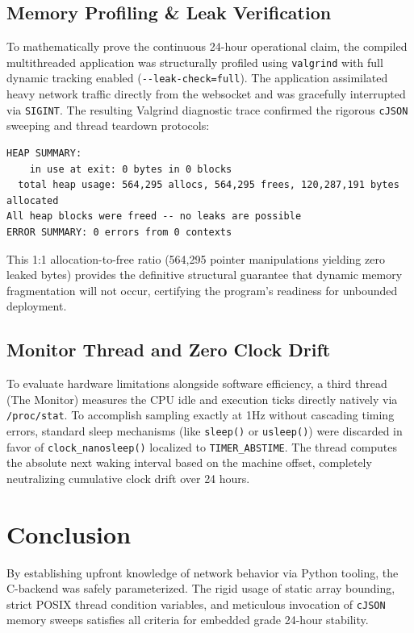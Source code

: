 \documentclass[12pt,a4paper]{article}
\begin{document}
\subsection{Memory Profiling \& Leak Verification}
To mathematically prove the continuous 24-hour operational claim, the compiled multithreaded application was structurally profiled using \texttt{valgrind} with full dynamic tracking enabled (\texttt{-{}-leak-check=full}).
The application assimilated heavy network traffic directly from the websocket and was gracefully interrupted via \texttt{SIGINT}. The resulting Valgrind diagnostic trace confirmed the rigorous \texttt{cJSON} sweeping and thread teardown protocols:
\begin{verbatim}
HEAP SUMMARY:
    in use at exit: 0 bytes in 0 blocks
  total heap usage: 564,295 allocs, 564,295 frees, 120,287,191 bytes allocated
All heap blocks were freed -- no leaks are possible
ERROR SUMMARY: 0 errors from 0 contexts
\end{verbatim}
This 1:1 allocation-to-free ratio (564,295 pointer manipulations yielding zero leaked bytes) provides the definitive structural guarantee that dynamic memory fragmentation will not occur, certifying the program's readiness for unbounded deployment.

\subsection{Monitor Thread and Zero Clock Drift}
To evaluate hardware limitations alongside software efficiency, a third thread (The Monitor) measures the CPU idle and execution ticks directly natively via \texttt{/proc/stat}. 
To accomplish sampling exactly at 1Hz without cascading timing errors, standard sleep mechanisms (like \texttt{sleep()} or \texttt{usleep()}) were discarded in favor of \texttt{clock\_nanosleep()} localized to \texttt{TIMER\_ABSTIME}. The thread computes the absolute next waking interval based on the machine offset, completely neutralizing cumulative clock drift over 24 hours.

\section{Conclusion}
By establishing upfront knowledge of network behavior via Python tooling, the C-backend was safely parameterized. The rigid usage of static array bounding, strict POSIX thread condition variables, and meticulous invocation of \texttt{cJSON} memory sweeps satisfies all criteria for embedded grade 24-hour stability.

\end{document}
